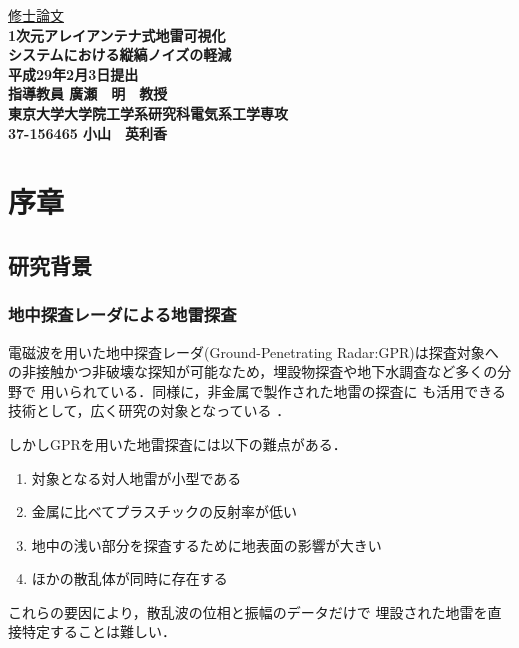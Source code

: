 ﻿\documentclass[12pt,oneside]{jsbook}
\begin{document}
\pagestyle{empty}
\begin{center}
\vspace*{3cm} \underline{\HUGE 修士論文} \\
\vspace{0.5cm}
\bf{
\Huge 1次元アレイアンテナ式地雷可視化\\
\Huge システムにおける縦縞ノイズの軽減}\\
\vspace{0.5cm}
\huge 平成29年2月3日提出 \\
\vspace{3cm}
\huge 指導教員 \hspace{5cm} 廣瀬　明　教授 \\
\vspace{2cm}
\Large 東京大学大学院工学系研究科電気系工学専攻 \\
\vspace{1cm}
\huge 37-156465 \hspace{3cm} 小山　英利香
\end{center}


\newpage 
\setcounter{page}{1}
\pagestyle{headings}
\tableofcontents

\newpage 
\chapter{序章}
\section{研究背景}
\subsection{地中探査レーダによる地雷探査}
電磁波を用いた地中探査レーダ(Ground-Penetrating Radar:GPR)は探査対象へ
の非接触かつ非破壊な探知が可能なため，埋設物探査や地下水調査など多くの分野で
用いられている\cite{Arai}\cite{2007TCounts}．同様に，非金属で製作された地雷の探査に
も活用できる技術として，広く研究の対象となっている\cite{chichi}\cite{JeroenYarovoy}\cite{YaroboyLighthart}\cite{2004MSato}
\cite{2005Sato}\cite{2009Sato}．

しかしGPRを用いた地雷探査には以下の難点がある．
\begin{enumerate}
\item 対象となる対人地雷が小型である
\item 金属に比べてプラスチックの反射率が低い
\item 地中の浅い部分を探査するために地表面の影響が大きい
\item ほかの散乱体が同時に存在する
\end{enumerate}
これらの要因により，散乱波の位相と振幅のデータだけで
埋設された地雷を直接特定することは難しい．
\end{document}
